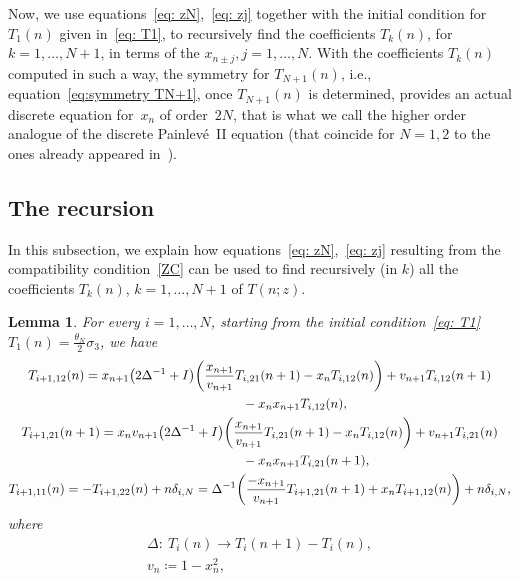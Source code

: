 \documentclass[pdftex]{sigma}%
\numberwithin{equation}{section}
\newtheorem{Lemma}[Theorem]{Lemma}
\begin{document}
Now, we use equations~\eqref{eq: zN},~\eqref{eq: zj} together with the initial condition for $T_1(n)$ given in~\eqref{eq: T1}, to recursively find the coefficients $T_k(n)$, for $k=1,\dots, N+1$, in terms of the $x_{n\pm j}, j=1,\dots,N$. With the coefficients $T_k(n)$ computed in such a way, the symmetry for $T_{N+1}(n)$, i.e., equation~\eqref{eq:symmetry TN+1}, once $T_{N+1}(n)$ is determined, provides an actual discrete equation for~$x_n$ of order~$2N$, that is what we call the higher order analogue of the discrete Painlev\'e~II equation (that coincide for $N=1,2$ to the ones already appeared in~\cite{AV, Borodindiscrete, joshi1999discrete}).

	\subsection{The recursion}
	In this subsection, we explain how equations~\eqref{eq: zN},~\eqref{eq: zj} resulting from the compatibility condition~\eqref{ZC} can be used to find recursively (in $k$) all the coefficients $T_k(n)$, $k=1,\dots, N+1$ of $T(n;z)$.
	\begin{Lemma}
		For every $i=1,\dots, N$, starting from the initial condition~\eqref{eq: T1} $T_1(n)=\frac{\theta_N}{2}\sigma_3$, we have
\begin{gather*}
T_{i+1,12}(n)=x_{n+1}\big(2\Delta^{-1}+I\big)\bigg(\dfrac{x_{n+1}}{v_{n+1}} T_{i,21}(n+1)-x_nT_{i,12}(n)\bigg)+v_{n+1}T_{i,12}(n+1)
\\
\hphantom{T_{i+1,12}(n)=}-x_nx_{n+1}T_{i,12}(n),
\\
T_{i+1,21}(n+1)=x_nv_{n+1}\big(2\Delta^{-1}+I\big)\bigg(\dfrac{x_{n+1}}{v_{n+1}} T_{i,21}(n+1)-x_nT_{i,12}(n)\bigg)+v_{n+1}T_{i,21}(n)
\\
\hphantom{T_{i+1,21}(n+1)=}-x_nx_{n+1}T_{i,21}(n+1),
\\
T_{i+1,11}(n)=-T_{i+1,22}(n)+n\delta_{i,N}=\Delta^{-1}\bigg(\dfrac{-x_{n+1}}{v_{n+1}} T_{i+1,21}(n+1)+x_nT_{i+1,12}(n)\bigg)+n\delta_{i,N},
\end{gather*}
	where 	
	\begin{gather}
	\label{def delta} \Delta\colon\ T_i(n)\to T_i(n+1)-T_i(n),
\\
	\label{def vn} v_n\coloneqq 1-x_{n}^2,
	\end{gather}
	\end{Lemma}
\end{document}
